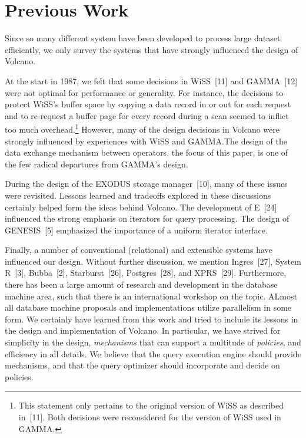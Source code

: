 \documentclass[a4paper,12pt,notitlepage,twoside,openright]{article}
\begin{document}
\section{Previous Work}

Since so many different system have been developed
to process large dataset efficiently, we only survey the systems
that have strongly influenced the design of Volcano.

At the start in 1987, we felt that some decisions in
WiSS~{[11]} and GAMMA~{[12]} were not optimal for performance
or generality. For instance, the decisions to protect
WiSS's buffer space by copying a data record in or out for
each request and to re-request a buffer page for every
record during a scan seemed to inflict too much overhead.\footnote{
  This statement only pertains to the original version of
  WiSS as described in~{[11]}. Both decisions were reconsidered for
  the version of WiSS used in GAMMA.
}
However, many of the design decisions in Volcano were
strongly influenced by experiences with WiSS and
GAMMA.The design of the data exchange mechanism
between operators, the focus of this paper, is one of the
few radical departures from GAMMA's design.

During the design of the EXODUS storage manager~{[10]},
many of these issues were revisited. Lessons learned
and tradeoffs explored in these discussions certainly helped
form the ideas behind Volcano. The development of E~{[24]}
influenced the strong emphasis on iterators for query processing.
The design of GENESIS~{[5]} emphasized the
importance of a uniform iterator interface.

Finally, a number of conventional (relational) and
extensible systems have influenced our design. Without
further discussion, we mention Ingres~{[27]}, System R~{[3]},
Bubba~{[2]}, Starburst~{[26]}, Postgres~{[28]}, and XPRS~{[29]}.
Furthermore, there has been a large amount of research and
development in the database machine area, such that there
is an international workshop on the topic. ALmost all database
machine proposals and implementations utilize parallelism
in some form. We certainly have learned from this
work and tried to include its lessons in the design and
implementation of Volcano. In particular, we have strived
for simplicity in the design, \emph{mechanisms} that can support a
multitude of \emph{policies}, and efficiency in all details. We
believe that the query execution engine should provide
mechanisms, and that the query optimizer should incorporate
and decide on policies.
\end{document}

